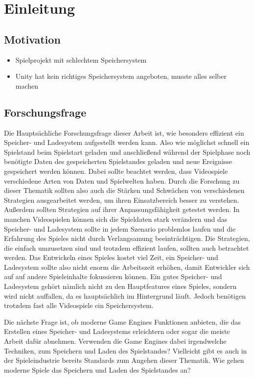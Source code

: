 \chapter{Einleitung}\label{ch:introduction}
\section{Motivation}
\begin{itemize}
    \item Spielprojekt mit schlechtem Speichersystem 
    \item Unity hat kein richtiges Speichersystem angeboten, musste alles selber machen
\end{itemize}

\section{Forschungsfrage}
Die Hauptsächliche Forschungsfrage dieser Arbeit ist, wie besonders effizient ein Speicher- und Ladesystem aufgestellt werden kann. Also wie möglichst schnell ein Spielstand beim Spielstart geladen und anschließend während der Spielphase noch benötigte Daten des gespeicherten Spielstandes geladen und neue Ereignisse gespeichert werden können. Dabei sollte beachtet werden, dass Videospiele verschiedene Arten von Daten und Spielwelten haben. Durch die Forschung zu dieser Thematik sollten also auch die Stärken und Schwächen von verschiedenen Strategien ausgearbeitet werden, um ihren Einsatzbereich besser zu verstehen. Außerdem sollten Strategien auf ihrer Anpassungsfähigkeit getestet werden. In manchen Videospielen können sich die Spieldaten stark verändern und das Speicher- und Ladesystem sollte in jedem Szenario problemlos laufen und die Erfahrung des Spieles nicht durch Verlangsamung beeinträchtigen. Die Strategien, die einfach umzusetzen sind und trotzdem effizient laufen, sollten auch betrachtet werden. Das Entwickeln eines Spieles kostet viel Zeit, ein Speicher- und Ladesystem sollte also nicht enorm die Arbeitszeit erhöhen, damit Entwickler sich auf auf andere Spieleinhalte fokussieren können. Ein gutes Speicher- und Ladesystem gehört nämlich nicht zu den Hauptfeatures eines Spieles, sondern wird nicht auffallen, da es hauptsächlich im Hintergrund läuft. Jedoch benötigen trotzdem fast alle Videospiele ein Speichersystem.  

Die nächste Frage ist, ob moderne Game Engines Funktionen anbieten, die das Erstellen eines Speicher- und Ladesystems erleichtern oder sogar die meiste Arbeit dafür abnehmen. Verwenden die Game Engines dabei irgendwelche Techniken, zum Speichern und Laden des Spielstandes? Vielleicht gibt es auch in der Spieleindustrie bereits Standards zum Angehen dieser Thematik. Wie gehen moderne Spiele das Speichern und Laden des Spielstandes an?


